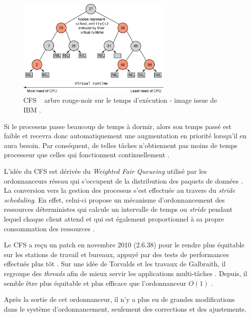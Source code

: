 \documentclass[letterpaper]{article}
\begin{document}
\begin{figure}[h]
\begin{center}
\includegraphics[width=3.0in]{figure1.png}
\caption{\og CFS \fg ~ arbre rouge-noir sur le temps d'exécution - image issue de IBM \citep{jones2009inside}.}
\label{fig1}
\end{center}
\end{figure}

Si le processus passe beaucoup de temps à dormir, alors son temps passé est faible et recevra donc automatiquement une augmentation en priorité lorsqu'il en aura besoin. Par conséquent, de telles tâches n'obtiennent pas moins de temps processeur que celles qui fonctionnent continuellement \citep{Wong:2008:TAF:1400097.1400102}.

L'idée du CFS est dérivée du \textit{Weighted Fair Queueing} utilisé par les ordonnanceurs réseau qui s'occupent de la distribution des paquets de données \citep{Demers:1989:ASF:75247.75248}. La conversion vers la gestion des processus s'est effectuée au travers du \textit{stride scheduling}. En effet, celui-ci propose un mécanisme d'ordonnancement des ressources déterministes qui calcule un intervalle de temps ou \textit{stride} pendant lequel chaque client attend et qui est également proportionnel à sa propre consommation des ressources \citep{Waldspurger:1995:LSS:888601}.

Le CFS a reçu un patch en novembre 2010 (2.6.38) pour le rendre plus équitable sur les stations de travail et bureaux, appuyé par des tests de performances effectués plus tôt \citep{7280991}. Sur une idée de Torvalds et les travaux de Galbraith, il regroupe des \textit{threads} afin de mieux servir les applications multi-tâches \citep{Wong:2008:TAF:1400097.1400102}. Depuis, il semble être plus équitable et plus efficace que l'ordonnanceur $O(1)$ \citep{4631872}.

Après la sortie de cet ordonnanceur, il n'y a plus eu de grandes modifications dans le système d'ordonnancement, seulement des corrections et des ajustements.
\end{document}
